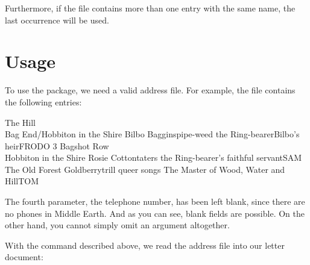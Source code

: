 Furthermore, if the file contains more than one entry with the same
 name, the last occurrence will be used.%
%
\EndIndexGroup


\section{Usage}
\BeginIndexGroup
{}%
%
To use the package, we need a valid address file.  For example, the file
 contains the following entries:
\begin{lstcode}
            {The Hill\\ Bag End/Hobbiton in the Shire}{}%
            {Bilbo Baggins}{pipe-weed}%
            {the Ring-bearer}{Bilbo's heir}{FRODO}
            {3 Bagshot Row\\Hobbiton in the Shire}{}%
            {Rosie Cotton}{taters}%
            {the Ring-bearer's faithful servant}{SAM}
            {The Old Forest}{}%
            {Goldberry}{trill queer songs}%
            {The Master of Wood, Water and Hill}{TOM}
\end{lstcode}

The fourth parameter, the telephone number, has been left blank, since there
are no phones in Middle Earth. And as you can see, blank fields are possible.
On the other hand, you cannot simply omit an argument altogether.

\BeginIndexGroup
{}
With the  command described above, we read the address
file into our letter document:
\begin{lstcode}
\end{lstcode}
\EndIndexGroup

